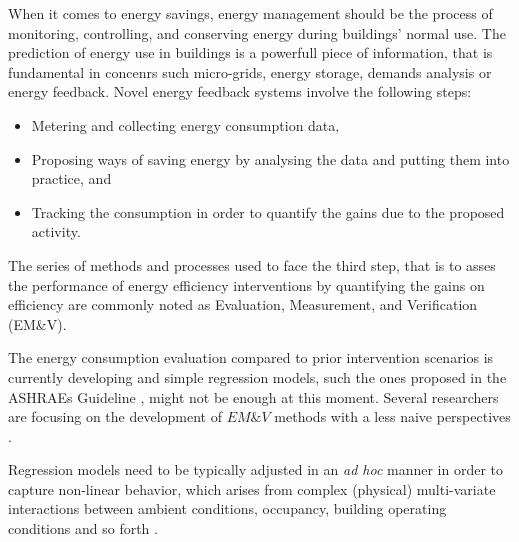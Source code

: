 \documentclass[10pt, conference, compsocconf]{IEEEtran}
\begin{document}
When it comes to energy savings, energy management should be the process of monitoring, controlling, and conserving energy during buildings' normal use.  The prediction of energy use in buildings is a powerfull piece of information, that is fundamental in concenrs such micro-grids, energy storage, demands analysis or energy feedback. Novel energy feedback systems involve the following steps:

\begin{itemize}
\item Metering and collecting energy consumption data,
\item Proposing ways of saving energy by analysing the data and putting them into practice, and
\item Tracking the consumption in order to quantify the gains due to the proposed activity.
\end{itemize}


The series of methods and processes used to face the third step, that is to asses the performance of energy efficiency interventions by quantifying the gains on efficiency are commonly noted as Evaluation, Measurement, and Verification (EM\&V). 



The energy consumption evaluation compared to prior intervention scenarios is currently developing and  simple regression models, such the ones proposed in the ASHRAEs Guideline \cite{ashrae2002ashrae}, might not be enough at this moment. Several researchers are focusing on the development of $EM\&V$  methods with a less naive perspectives \cite{ramalloidentifying}. 



Regression models need to be typically adjusted in an \textit{ad hoc} manner in order to capture non-linear behavior, which arises from complex (physical) multi-variate interactions between ambient conditions, occupancy, building operating conditions and so forth \cite{heo2012gaussian}.
\end{document}
